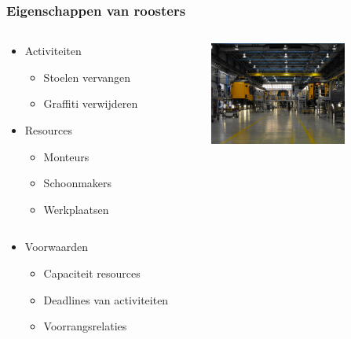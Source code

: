 \begin{frame}\frametitle{Eigenschappen van roosters}
	\begin{columns}[T]
	    \begin{column}{.4\textwidth}
			\begin{itemize}
		        \item Activiteiten
		        \begin{itemize}
		            \item Stoelen vervangen
		            \item Graffiti verwijderen      
		        \end{itemize}
		        \item Resources
	            \begin{itemize}
	                \item Monteurs
	                \item Schoonmakers
	                \item Werkplaatsen
	            \end{itemize}
		    \end{itemize}
	    \end{column}
	    \begin{column}{.5\textwidth}
	    	\includegraphics[width=4.5cm]{images/werkplaats.jpg}
	    \end{column}
  	\end{columns}
    \begin{itemize}
        \item Voorwaarden
        \begin{itemize}
        	\item Capaciteit resources
            \item Deadlines van activiteiten
            \item Voorrangsrelaties
        \end{itemize}
    \end{itemize}
\end{frame}
